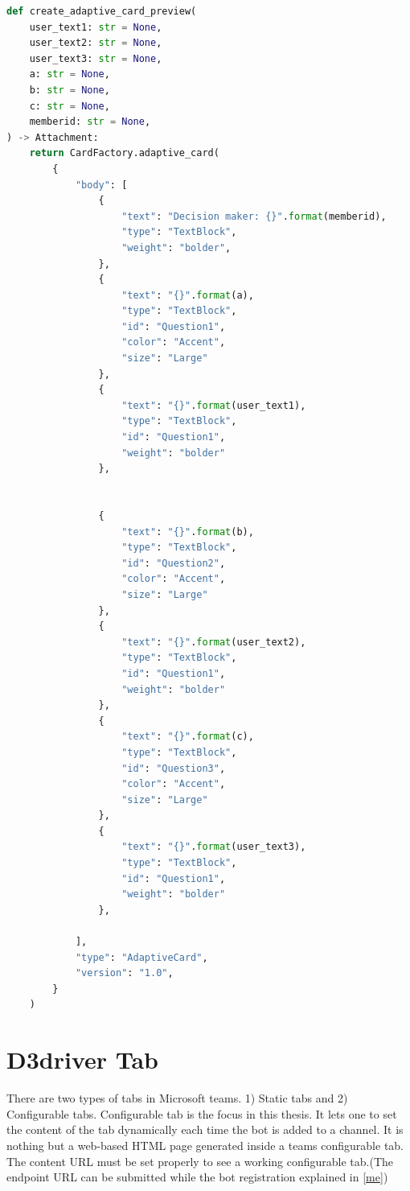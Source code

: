 \begin{lstlisting}[caption={Preview card},label={lst:pcard},language=python]
def create_adaptive_card_preview(
    user_text1: str = None,
    user_text2: str = None,
    user_text3: str = None,
    a: str = None,
    b: str = None,
    c: str = None,
    memberid: str = None,
) -> Attachment:
    return CardFactory.adaptive_card(
        {
            "body": [
                {
                    "text": "Decision maker: {}".format(memberid),
                    "type": "TextBlock",
                    "weight": "bolder",
                },
                {
                    "text": "{}".format(a), 
                    "type": "TextBlock", 
                    "id": "Question1",
                    "color": "Accent",
                    "size": "Large"
                },
                {
                    "text": "{}".format(user_text1), 
                    "type": "TextBlock", 
                    "id": "Question1",
                    "weight": "bolder"
                },


                {
                    "text": "{}".format(b),
                    "type": "TextBlock", 
                    "id": "Question2",
                    "color": "Accent",
                    "size": "Large"
                },
                {
                    "text": "{}".format(user_text2), 
                    "type": "TextBlock", 
                    "id": "Question1",
                    "weight": "bolder"
                },
                { 
                    "text": "{}".format(c), 
                    "type": "TextBlock", 
                    "id": "Question3",
                    "color": "Accent",
                    "size": "Large"
                },
                {
                    "text": "{}".format(user_text3), 
                    "type": "TextBlock", 
                    "id": "Question1",
                    "weight": "bolder"
                },

            ],
            "type": "AdaptiveCard",
            "version": "1.0",
        }
    )
\end{lstlisting}

\section{D3driver Tab}
There are two types of tabs in Microsoft teams. 1) Static tabs and 2) Configurable tabs. Configurable tab is the focus in this thesis. It lets one to set the content of the tab dynamically each time the 
bot is added to a channel. It is nothing but a web-based HTML page generated inside a teams configurable tab. The content URL must be set properly to see a working configurable tab.(The endpoint URL can be submitted while the bot registration explained in \ref{me})

